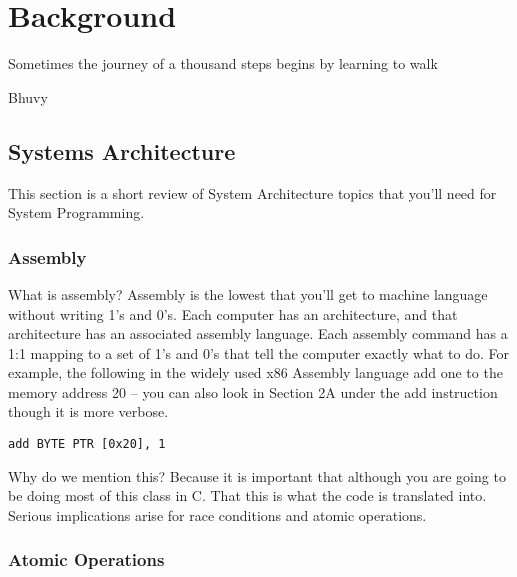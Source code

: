 \chapter{Background}

\epigraph{Sometimes the journey of a thousand steps begins by learning to walk}{Bhuvy}

\section{Systems Architecture}

This section is a short review of System Architecture topics that you'll need for System Programming.

\subsection{Assembly}

What is assembly? Assembly is the lowest that you'll get to machine language without writing 1's and 0's.
Each computer has an architecture, and that architecture has an associated assembly language.
Each assembly command has a 1:1 mapping to a set of 1's and 0's that tell the computer exactly what to do.
For example, the following in the widely used x86 Assembly language add one to the memory address 20 \cite{wiki:xxx} -- you can also look in \cite{guide2011intel} Section 2A under the add instruction though it is more verbose.

\begin{lstlisting}[language={[x86masm]Assembler}]
add BYTE PTR [0x20], 1
\end{lstlisting}

Why do we mention this? Because it is important that although you are going to be doing most of this class in C.
That this is what the code is translated into.
Serious implications arise for race conditions and atomic operations.

\subsection{Atomic Operations}

